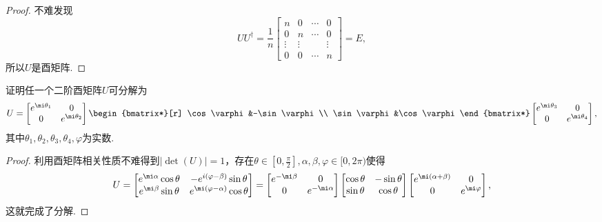 \begin{proof}
	不难发现
	\[
		UU^\dagger=\frac{1}{n}\begin{bmatrix}
			n      & 0      & \cdots & 0      \\
			0      & n      & \cdots & 0      \\
			\vdots & \vdots &        & \vdots \\
			0      & 0      & \cdots & n
		\end{bmatrix}=E,
	\]
	所以$U$是酉矩阵.
\end{proof}
\begin{prob}[12]
	证明任一个二阶酉矩阵$U$可分解为
	\[
		U=\begin{bmatrix}
			e^{\mi\theta_1} & 0               \\
			0               & e^{\mi\theta_2}
		\end{bmatrix}\begin{bmatrix*}[r]
			\cos\varphi&-\sin\varphi\\
			\sin\varphi&\cos\varphi
		\end{bmatrix*}\begin{bmatrix}
			e^{\mi\theta_3} & 0               \\
			0               & e^{\mi\theta_4}
		\end{bmatrix},
	\]
	其中$\theta_1,\theta_2,\theta_3,\theta_4,\varphi$为实数.
\end{prob}
\begin{proof}
	利用酉矩阵相关性质不难得到$|\det(U)|=1$，存在$\theta\in[0,\frac{\pi}{2}],\alpha,\beta,\varphi\in[0,2\pi)$使得
	\[
		U=\begin{bmatrix}
			e^{\mi\alpha}\cos\theta & -e^{i(\varphi-\beta)}\sin\theta   \\
			e^{\mi\beta}\sin\theta  & e^{\mi(\varphi-\alpha)}\cos\theta
		\end{bmatrix}=\begin{bmatrix}
			e^{-\mi\beta} & 0              \\
			0             & e^{-\mi\alpha}
		\end{bmatrix}\begin{bmatrix}
			\cos\theta & -\sin\theta \\
			\sin\theta & \cos\theta
		\end{bmatrix}\begin{bmatrix}
			e^{\mi(\alpha+\beta)} & 0              \\
			0                     & e^{\mi\varphi}
		\end{bmatrix},
	\]
	这就完成了分解.
\end{proof}
